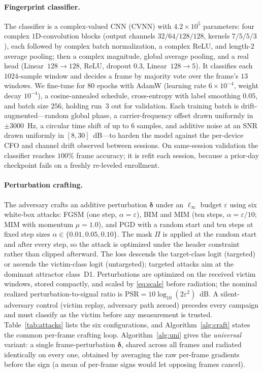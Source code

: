 \documentclass[11pt]{article}
\begin{document}
\paragraph{Fingerprint classifier.} The classifier is a complex-valued CNN (CVNN) with
$4.2\times10^{5}$ parameters: four complex $1$D-convolution blocks (output channels
$32/64/128/128$, kernels $7/5/5/3$), each followed by complex batch normalization, a complex ReLU,
and length-$2$ average pooling; then a complex magnitude, global average pooling, and a real head
(Linear~$128{\to}128$, ReLU, dropout $0.3$, Linear~$128{\to}5$). It classifies each $1024$-sample
window and decides a frame by majority vote over the frame's $13$ windows. We fine-tune for $80$
epochs with AdamW (learning rate $6\times10^{-4}$, weight decay $10^{-4}$), a cosine-annealed
schedule, cross-entropy with label smoothing $0.05$, and batch size $256$, holding run~3 out for
validation. Each training batch is drift-augmented---random global phase, a carrier-frequency
offset drawn uniformly in $\pm3000$~Hz, a circular time shift of up to $6$ samples, and additive
noise at an SNR drawn uniformly in $[8,30]$~dB---to harden the model against the per-device CFO and
channel drift observed between sessions. On same-session validation the classifier reaches $100\%$
frame accuracy; it is refit each session, because a prior-day checkpoint fails on a freshly
re-leveled enrollment.

\paragraph{Perturbation crafting.} The adversary crafts an additive perturbation
$\boldsymbol\delta$ under an $\ell_\infty$ budget $\varepsilon$ using six white-box attacks: FGSM
(one step, $\alpha=\varepsilon$), BIM and MIM (ten steps, $\alpha=\varepsilon/10$; MIM with
momentum $\mu=1.0$), and PGD with a random start and ten steps at fixed step sizes
$\alpha\in\{0.01,0.05,0.10\}$. The mask $\Pi$ is applied at the random start and after every step,
so the attack is optimized under the header constraint rather than clipped afterward. The loss
descends the target-class logit (targeted) or ascends the victim-class logit (untargeted); targeted
attacks aim at the dominant attractor class~D1. Perturbations are optimized on the received victim
windows, stored compactly, and scaled by \eqref{eq:scale} before radiation; the nominal realized
perturbation-to-signal ratio is $\mathrm{PSR}=10\log_{10}(2\varepsilon^2)$~dB. A silent-adversary
control (victim replay, adversary path zeroed) precedes every campaign and must classify as the
victim before any measurement is trusted. Table~\ref{tab:attacks} lists the six configurations,
and Algorithm~\ref{alg:craft} states the common per-frame crafting loop.
Algorithm~\ref{alg:uni} gives the \emph{universal} variant: a single frame-perturbation
$\boldsymbol\delta$, shared across all frames and radiated identically on every one, obtained by
averaging the raw per-frame gradients before the sign (a mean of per-frame signs would let
opposing frames cancel).
\end{document}
